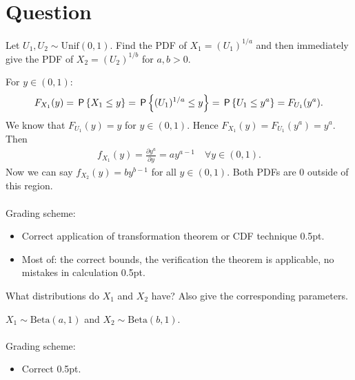 \section{Question}
\begin{exercise}[1]
Let $U_1,U_2\sim\text{Unif}(0,1)$. Find the PDF of $X_1 = (U_1)^{1/a}$ and then immediately give the PDF of $X_2 = (U_2)^{1/b}$ for $a,b>0$.
\begin{solution}
For $y\in(0,1)$:
\begin{align*}
    F_{X_1}(y) = \P{X_1\leq y} = \P{(U_1)^{1/a}\leq y} = \P{U_1\leq y^a} = F_{U_1}(y^a).
\end{align*}
We know that $F_{U_1}(y) = y$ for $y\in(0,1)$. Hence $F_{X_1}(y) =  F_{U_1}(y^a) = y^a$. Then
\begin{align*}
    f_{X_1}(y) = \frac{\partial y^a}{\partial y} = a y^{a-1}\quad\forall y\in(0,1).
\end{align*}
Now we can say $f_{X_2}(y) = b y^{b-1}$ for all $y\in(0,1)$. Both PDFs are 0 outside of this region.
\\\\
Grading scheme:
\begin{itemize}
    \item Correct application of transformation theorem or CDF technique 0.5pt.
    \item Most of: the correct bounds, the verification the theorem is applicable, no mistakes in calculation 0.5pt.
\end{itemize}
\end{solution}
\end{exercise}

\begin{exercise}[0.5]
What distributions do $X_1$ and $X_2$ have? Also give the corresponding parameters.
\begin{solution}
$X_1\sim\text{Beta}(a,1)$ and $X_2\sim\text{Beta}(b,1)$.
\\\\
Grading scheme:
\begin{itemize}
    \item Correct 0.5pt.
\end{itemize}
\end{solution}
\end{exercise}

